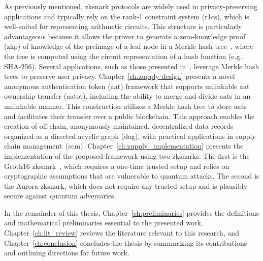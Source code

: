 As previously mentioned, \gls{zksnark} protocols are widely used in privacy-preserving applications and typically rely on the rank-1 constraint system (\gls{r1cs}), which is well-suited for representing arithmetic circuits. This structure is particularly advantageous because it allows the prover to generate a zero-knowledge proof (\gls{zkp}) of knowledge of the preimage of a leaf node in a Merkle hash tree~\cite{Merkle1980}, where the tree is computed using the circuit representation of a hash function (e.g., SHA-256). Several applications, such as those presented in~\cite{zcash-proc,Hawk,williamson2018aztec,ZEXE,Steffen2022Zapper}, leverage Merkle hash trees to preserve user privacy.
Chapter~\ref{ch:zupply-design} presents a novel anonymous authentication token (\gls{aat}) framework that supports unlinkable \gls{aat} ownership transfer (\gls{aatot}), including the ability to merge and divide \glspl{aat} in an unlinkable manner. This construction utilizes a Merkle hash tree to store \glspl{aat} and facilitates their transfer over a public blockchain. This approach enables the creation of off-chain, anonymously maintained, decentralized data records organized as a directed acyclic graph (\gls{dag}), with practical applications in supply chain management~(\gls{scm}). 
Chapter~\ref{ch:zupply_implementation} presents the implementation of the proposed framework using two \glspl{zksnark}. The first is the Groth16 \gls{zksnark}~\cite{Groth2016}, which requires a one-time trusted setup and relies on cryptographic assumptions that are vulnerable to quantum attacks. The second is the Aurora \gls{zksnark}\cite{Aurora2019}, which does not require any trusted setup and is plausibly secure against quantum adversaries.

In the remainder of this thesis, Chapter~\ref{ch:preliminaries} provides the definitions and mathematical preliminaries essential to the presented work, Chapter~\ref{ch:lit_review} reviews the literature relevant to this research, and Chapter~\ref{ch:conclusion} concludes the thesis by summarizing its contributions and outlining directions for future work.

